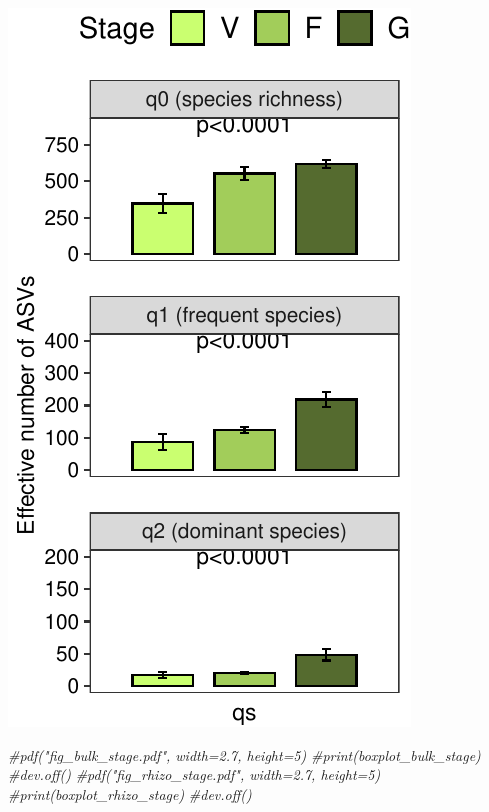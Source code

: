 \documentclass[]{interact}
\theoremstyle{plain}%
\theoremstyle{definition}
\theoremstyle{remark}
\newenvironment{Shaded}{\begin{snugshade}}{\end{snugshade}}
\newcommand{\CommentTok}[1]{\textcolor[rgb]{0.56,0.35,0.01}{\textit{#1}}}
\begin{document}
\begin{center}\includegraphics{Doc_pdf_files/figure-latex/unnamed-chunk-32-2} \end{center}

\begin{Shaded}
\begin{Highlighting}[]
\CommentTok{\#pdf("fig\_bulk\_stage.pdf", width=2.7, height=5)}
\CommentTok{\#print(boxplot\_bulk\_stage)}
\CommentTok{\#dev.off()}
\CommentTok{\#pdf("fig\_rhizo\_stage.pdf", width=2.7, height=5)}
\CommentTok{\#print(boxplot\_rhizo\_stage)}
\CommentTok{\#dev.off()}
\end{Highlighting}
\end{Shaded}
\end{document}
